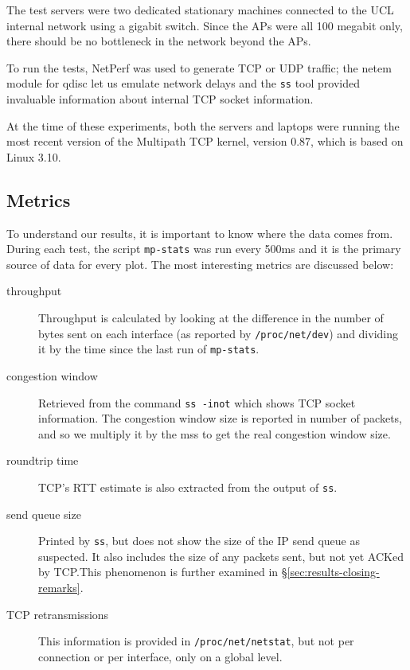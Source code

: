 The test servers were two dedicated stationary machines connected to the UCL
internal network using a gigabit switch. Since the APs were all 100 megabit
only, there should be no bottleneck in the network beyond the APs.

To run the tests, NetPerf was used to generate TCP or UDP traffic; the netem
module for qdisc let us emulate network delays and the \texttt{ss} tool provided
invaluable information about internal TCP socket information.

At the time of these experiments, both the servers and laptops were running the
most recent version of the Multipath TCP kernel, version 0.87, which is based
on Linux 3.10.

\subsection{Metrics}
\label{sec:met:metrics}
To understand our results, it is important to know where the data comes from.
During each test, the script \texttt{mp-stats} was run every 500ms and it is the
primary source of data for every plot. The most interesting metrics are
discussed below:

\begin{description}
  \item[throughput]
    Throughput is calculated by looking at the difference in the number of bytes
    sent on each interface (as reported by \texttt{/proc\-/net/\-dev}) and
    dividing it by the time since the last run of \texttt{mp-stats}.
  \item[congestion window]
    Retrieved from the command \texttt{ss -inot} which shows TCP socket
    information. The congestion window size is reported in number of packets,
    and so we multiply it by the mss to get the real congestion window size.
  \item[roundtrip time]
    TCP's RTT estimate is also extracted from the output of \texttt{ss}.
  \item[send queue size]
    Printed by \texttt{ss}, but does not show the size of the IP send queue as
    suspected. It also includes the size of any packets sent, but not yet ACKed
    by TCP.\@ This phenomenon is further examined in
    \S\ref{sec:results-closing-remarks}.
  \item[TCP retransmissions]
    This information is provided in \texttt{/proc\-/net/\-netstat}, but not per
    connection or per interface, only on a global level.
\end{description}

